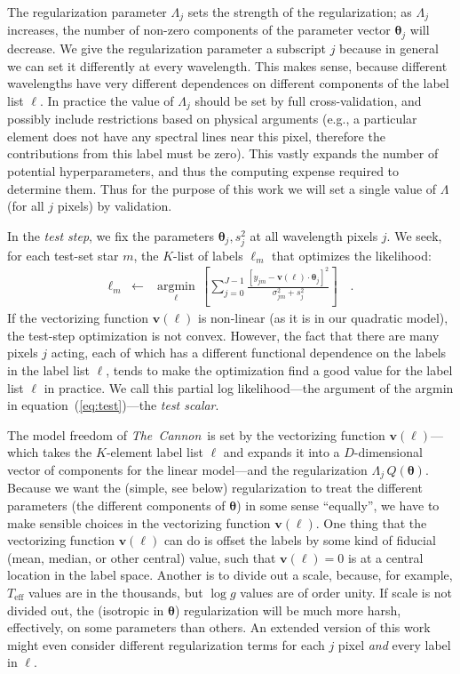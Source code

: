 \documentclass[12pt,preprint]{aastex}
\newcommand{\project}[1]{\textsl{#1}}
\newcommand{\TheCannon}{\project{The~Cannon}}
\newcommand{\logg}{\log g}
\newcommand{\Teff}{T_{\mathrm{eff}}}
\newcommand{\Dvector}[1]{\boldsymbol{#1}}
\newcommand{\vectheta}{\Dvector{\theta}}
\newcommand{\vecv}{\Dvector{v}}
\newcommand{\argmin}[1]{\underset{#1}{\operatorname{argmin}}\,}
\begin{document}
The regularization parameter $\Lambda_j$ sets the strength of the 
regularization; as $\Lambda_j$ increases, the number of non-zero components of 
the parameter vector $\vectheta_j$ will decrease.  We give the regularization 
parameter a subscript $j$ because in general we can set it differently at every
wavelength.  This makes sense, because different wavelengths have very different
dependences on different components of the label list $\ell$.  In practice the
value of $\Lambda_j$ should be set by full cross-validation, and possibly 
include restrictions based on physical arguments (e.g., a particular element 
does not have any spectral lines near this pixel, therefore the contributions
from this label must be zero).  This vastly expands the number of potential 
hyperparameters, and thus the computing expense required to determine them.  
Thus for the purpose of this work we will set a single value of $\Lambda$ (for 
all $j$ pixels) by validation.


In the \emph{test step}, we fix the parameters $\vectheta_j,s^2_j$ at all
wavelength pixels $j$.  We seek, for each test-set star $m$, the $K$-list of 
labels $\ell_m$ that optimizes the likelihood:
\begin{eqnarray}\label{eq:test}
  \ell_m &\leftarrow& \argmin{\ell}\left[
    \sum_{j=0}^{J-1} \frac{[y_{jm}-\vecv(\ell)\cdot\vectheta_j]^2}{\sigma^2_{jm}+s^2_j}
    \right]
  \quad .
\end{eqnarray}
If the vectorizing function $\vecv(\ell)$ is non-linear (as it is in our 
quadratic model), the test-step optimization is not convex.  However, the fact
that there are many pixels $j$ acting, each of which has a different functional
dependence on the labels in the label list $\ell$, tends to make the 
optimization find a good value for the label list $\ell$ in practice.  We call
this partial log likelihood---the argument of the argmin in 
equation~(\ref{eq:test})---the \emph{test scalar}.


The model freedom of \TheCannon\ is set by the vectorizing function 
$\vecv(\ell)$---which takes the $K$-element label list $\ell$ and expands it 
into a $D$-dimensional vector of components for the linear model---and the 
regularization $\Lambda_j\,Q(\vectheta)$.  Because we want the (simple, see 
below) regularization to treat the different parameters (the different 
components of $\vectheta$) in some sense ``equally'', we have to make sensible 
choices in the vectorizing function $\vecv(\ell)$.  One thing that the 
vectorizing function $\vecv(\ell)$ can do is offset the labels by some kind of
fiducial (mean, median, or other central) value, such that $\vecv(\ell)=0$ is at
a central location in the label space.  Another is to divide out a scale, 
because, for example, $\Teff$ values are in the thousands, but $\logg$ values
are of order unity.  If scale is not divided out, the (isotropic in $\vectheta$)
regularization will be much more harsh, effectively, on some parameters than 
others.  An extended version of this work might even consider different 
regularization terms for each $j$ pixel \emph{and} every label in $\ell$.
\end{document}
